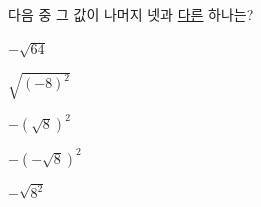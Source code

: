 다음 중 그 값이 나머지 넷과 \underline{다른} 하나는?
\begin{choices32}{\rule[-3ex]{0pt}{8ex}$-\sqrt{64}$}{\rule[-3ex]{0pt}{8ex}$\sqrt{(-8)^2}$}{\rule[-3ex]{0pt}{8ex}$-(\sqrt{8})^2$}{\rule[-3ex]{0pt}{8ex}$-(-\sqrt{8})^2$}{\rule[-3ex]{0pt}{8ex}$-\sqrt{8^2}$}\end{choices32}
